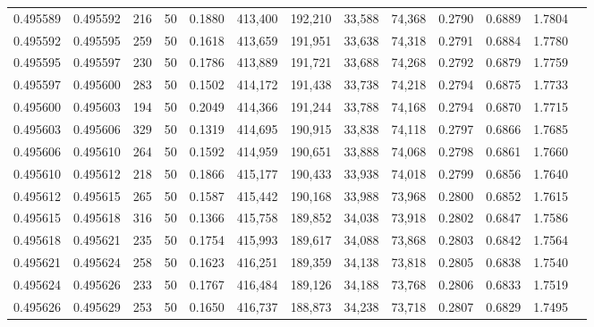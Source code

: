 \begin{tabular}{rrrrrrrrrrrrr}
0.495589 & 0.495592 &   216 &  50 &                                     0.1880 & 413,400 & 192,210 &  33,588 &  74,368 & 0.2790 & 0.6889 & 1.7804 \\
0.495592 & 0.495595 &   259 &  50 &                                     0.1618 & 413,659 & 191,951 &  33,638 &  74,318 & 0.2791 & 0.6884 & 1.7780 \\
0.495595 & 0.495597 &   230 &  50 &                                     0.1786 & 413,889 & 191,721 &  33,688 &  74,268 & 0.2792 & 0.6879 & 1.7759 \\
0.495597 & 0.495600 &   283 &  50 &                                     0.1502 & 414,172 & 191,438 &  33,738 &  74,218 & 0.2794 & 0.6875 & 1.7733 \\
0.495600 & 0.495603 &   194 &  50 &                                     0.2049 & 414,366 & 191,244 &  33,788 &  74,168 & 0.2794 & 0.6870 & 1.7715 \\
0.495603 & 0.495606 &   329 &  50 &                                     0.1319 & 414,695 & 190,915 &  33,838 &  74,118 & 0.2797 & 0.6866 & 1.7685 \\
0.495606 & 0.495610 &   264 &  50 &                                     0.1592 & 414,959 & 190,651 &  33,888 &  74,068 & 0.2798 & 0.6861 & 1.7660 \\
0.495610 & 0.495612 &   218 &  50 &                                     0.1866 & 415,177 & 190,433 &  33,938 &  74,018 & 0.2799 & 0.6856 & 1.7640 \\
0.495612 & 0.495615 &   265 &  50 &                                     0.1587 & 415,442 & 190,168 &  33,988 &  73,968 & 0.2800 & 0.6852 & 1.7615 \\
0.495615 & 0.495618 &   316 &  50 &                                     0.1366 & 415,758 & 189,852 &  34,038 &  73,918 & 0.2802 & 0.6847 & 1.7586 \\
0.495618 & 0.495621 &   235 &  50 &                                     0.1754 & 415,993 & 189,617 &  34,088 &  73,868 & 0.2803 & 0.6842 & 1.7564 \\
0.495621 & 0.495624 &   258 &  50 &                                     0.1623 & 416,251 & 189,359 &  34,138 &  73,818 & 0.2805 & 0.6838 & 1.7540 \\
0.495624 & 0.495626 &   233 &  50 &                                     0.1767 & 416,484 & 189,126 &  34,188 &  73,768 & 0.2806 & 0.6833 & 1.7519 \\
0.495626 & 0.495629 &   253 &  50 &                                     0.1650 & 416,737 & 188,873 &  34,238 &  73,718 & 0.2807 & 0.6829 & 1.7495 \\

\end{tabular}
